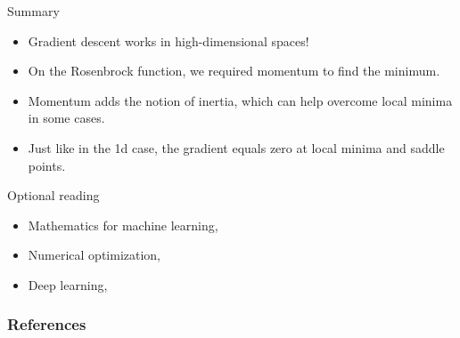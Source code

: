\documentclass{beamer}
\begin{document}
    \begin{frame}{Summary}
      \begin{itemize}
        \item Gradient descent works in high-dimensional spaces!
        \item On the Rosenbrock function, we required momentum to find the minimum.
        \item Momentum adds the notion of inertia, which can help overcome local minima in some cases.
        \item Just like in the 1d case, the gradient equals zero at local minima and saddle points.
      \end{itemize}
    \end{frame}

    \begin{frame}{Optional reading}
      \begin{itemize}
        \item Mathematics for machine learning, \cite[Chapter 5, Vector Calculus]{deisenroth2020mathematics}
        \item Numerical optimization, \cite[Chapter 8.2, Automatic Differentiation]{wright1999numerical}
        \item Deep learning, \cite[Chapter 8, Optimization for Training Deep Models]{goodfellow2016deep}
      \end{itemize}
    \end{frame}

    \begin{frame}
      \frametitle{References}
      \renewcommand*{\bibfont}{\scriptsize}
      \printbibliography
  \end{frame}
\end{document}
